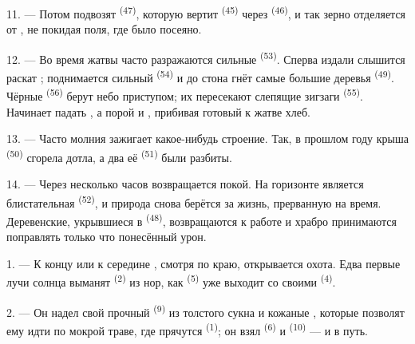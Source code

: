 11. --- Потом подвозят  \textsuperscript{(47)}, которую вертит
 \textsuperscript{(45)} через 
\textsuperscript{(46)}, и так зерно отделяется от , не покидая
поля, где было посеяно.

\VUsaut{5.0mm}
\VUsaut{3.4mm}

12. --- Во время жатвы часто разражаются сильные 
\textsuperscript{(53)}. Сперва издали слышится раскат ; поднимается
сильный  \textsuperscript{(54)} и до стона гнёт самые
большие деревья  \textsuperscript{(49)}. Чёрные 
\textsuperscript{(56)} берут небо приступом; их пересекают слепящие зигзаги
 \textsuperscript{(55)}. Начинает падать , а порой и
, прибивая готовый к жатве хлеб.

13. --- Часто молния зажигает какое-нибудь строение. Так, в прошлом году
крыша  \textsuperscript{(50)} сгорела дотла, а два её
 \textsuperscript{(51)} были разбиты.

14. --- Через несколько часов возвращается покой. На горизонте является
блистательная  \textsuperscript{(52)}, и природа снова берётся за
жизнь, прерванную на время. Деревенские, укрывшиеся в 
\textsuperscript{(48)}, возвращаются к работе и храбро принимаются поправлять
только что понесённый урон.

\VUsaut{6.0mm}
\VUsaut{3.6mm}

\VUsaut{1.4mm}
\VUsaut{4.0mm}

1. --- К концу  или к середине , смотря по
краю, открывается охота. Едва первые лучи солнца выманят 
\textsuperscript{(2)} из нор, как  \textsuperscript{(5)} уже выходит
со своими  \textsuperscript{(4)}.

2. --- Он надел свой прочный  \textsuperscript{(9)} из
толстого сукна и кожаные , которые позволят ему идти по
мокрой траве, где прячутся  \textsuperscript{(1)}; он взял
 \textsuperscript{(6)} и  \textsuperscript{(10)} --- и в
путь.

